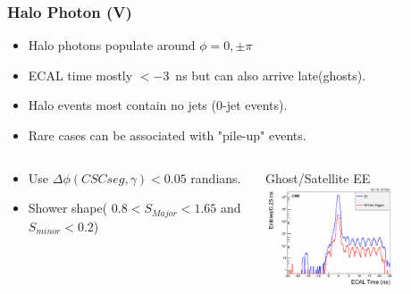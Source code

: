 \documentclass{beamer}
\begin{document}
\begin{frame}
\frametitle{Halo Photon (V)}
 \begin{minipage}[t]{0.85\paperwidth}
      \begin{tcolorbox}[colback=UNL@Cream!5,colframe=UMN@Maroon!40 ,title=\textcolor{black}{\textbf{Halo Photon Event Properties}}]
       \begin{itemize}
          \item Halo photons populate around $\phi=0, \pm \pi$
          \item ECAL time mostly $ < -3$~ns but can also arrive late(ghosts).
          \item Halo events most contain no jets ($0$-jet events).
          \item Rare cases can be associated with "pile-up" events.     
       \end{itemize}  
      \end{tcolorbox}
  \end{minipage}
  \begin{minipage}[t]{0.9\paperwidth}
     \begin{columns}
        \begin{tcolorbox}[colback=UNL@Cream!5,colframe=UMN@Maroon!40,title=\textcolor{black}{\textbf{Halo Photon Tagging Criteria}}] 
        \begin{itemize}
         \item Use $\Delta\phi(CSC seg, \gamma) < 0.05$ randians.
         \item Shower shape( $0.8 < S_{Major} < 1.65 $ and $ S_{minor} < 0.2 $)
        \end{itemize}
        \end{tcolorbox}
        \begin{varblock}[2.5cm]{Ghost/Satellite EE}
        \centering      
        \includegraphics[height=2.95cm,width=0.29\paperwidth]{THESISPLOTS/halo_EE_Time.png} 
        \end{varblock}
     \end{columns} 
  \end{minipage}   
\end{frame}
\end{document}
